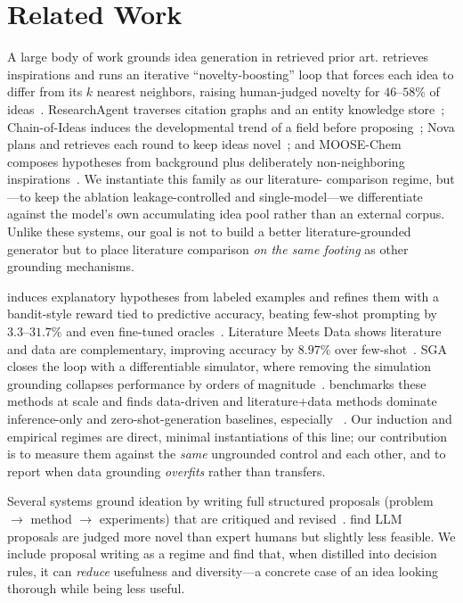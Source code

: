 \section{Related Work}
\label{sec:related}

 A large body of work grounds idea generation
in retrieved prior art. \scimon{} retrieves inspirations and runs an iterative
``novelty-boosting'' loop that forces each idea to differ from its $k$ nearest
neighbors, raising human-judged novelty for $46$--$58\%$ of
ideas~\citep{wang2023scimon}. ResearchAgent traverses citation graphs and an
entity knowledge store~\citep{baek2024researchagent}; Chain-of-Ideas induces the
developmental trend of a field before proposing~\citep{li2024coi}; Nova plans and
retrieves each round to keep ideas novel~\citep{hu2024nova}; and MOOSE-Chem composes
hypotheses from background plus deliberately non-neighboring
inspirations~\citep{yang2024moosechem}. We instantiate this family as our literature-
comparison regime, but---to keep the ablation leakage-controlled and single-model---we
differentiate against the model's own accumulating idea pool rather than an external
corpus. Unlike these systems, our goal is not to build a better literature-grounded
generator but to place literature comparison \emph{on the same footing} as other
grounding mechanisms.

 \hypogenic{} induces explanatory
hypotheses from labeled examples and refines them with a bandit-style
reward tied to predictive accuracy, beating few-shot prompting by $3.3$--$31.7\%$ and
even fine-tuned oracles~\citep{zhou2024hypogenic}. Literature Meets Data shows
literature and data are complementary, improving \OOD{} accuracy by
$8.97\%$ over few-shot~\citep{liu2024literature}. SGA closes the loop with a
differentiable simulator, where removing the simulation grounding collapses
performance by orders of magnitude~\citep{ma2024sga}. \hypobench{} benchmarks these
methods at scale and finds data-driven and literature+data methods dominate
inference-only and zero-shot-generation baselines, especially
\OOD~\citep{liu2025hypobench}. Our induction and empirical regimes are direct,
minimal instantiations of this line; our contribution is to measure them against the
\emph{same} ungrounded control and each other, and to report when data grounding
\emph{overfits} rather than transfers.

 Several systems ground ideation by
writing full structured proposals (problem $\rightarrow$ method $\rightarrow$
experiments) that are critiqued and revised~\citep{baek2024researchagent,si2024llm}.
\citet{si2024llm} find LLM proposals are judged more novel than expert humans but
slightly less feasible. We include proposal writing as a regime and find that, when
distilled into decision rules, it can \emph{reduce} usefulness and diversity---a
concrete case of an idea looking thorough while being less useful.

